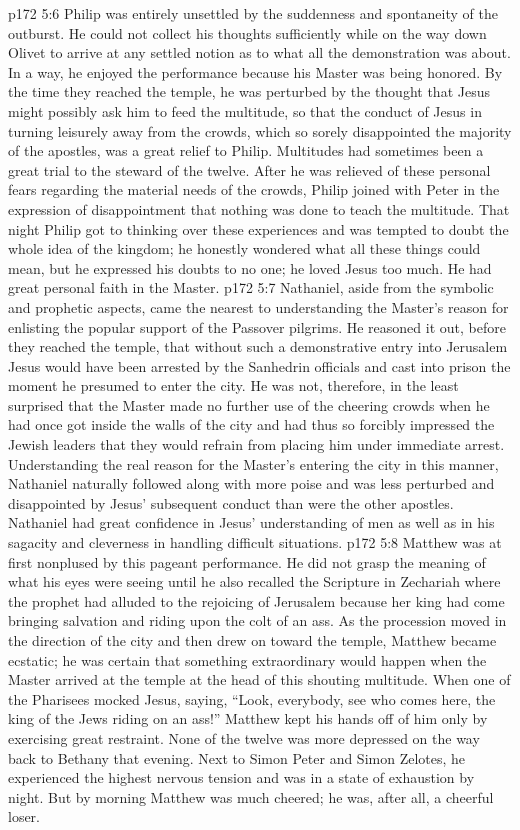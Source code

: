 \pc \vs p172 5:6 Philip was entirely unsettled by the suddenness and spontaneity of the outburst. He could not collect his thoughts sufficiently while on the way down Olivet to arrive at any settled notion as to what all the demonstration was about. In a way, he enjoyed the performance because his Master was being honored. By the time they reached the temple, he was perturbed by the thought that Jesus might possibly ask him to feed the multitude, so that the conduct of Jesus in turning leisurely away from the crowds, which so sorely disappointed the majority of the apostles, was a great relief to Philip. Multitudes had sometimes been a great trial to the steward of the twelve. After he was relieved of these personal fears regarding the material needs of the crowds, Philip joined with Peter in the expression of disappointment that nothing was done to teach the multitude. That night Philip got to thinking over these experiences and was tempted to doubt the whole idea of the kingdom; he honestly wondered what all these things could mean, but he expressed his doubts to no one; he loved Jesus too much. He had great personal faith in the Master.
\pc \vs p172 5:7 Nathaniel, aside from the symbolic and prophetic aspects, came the nearest to understanding the Master’s reason for enlisting the popular support of the Passover pilgrims. He reasoned it out, before they reached the temple, that without such a demonstrative entry into Jerusalem Jesus would have been arrested by the Sanhedrin officials and cast into prison the moment he presumed to enter the city. He was not, therefore, in the least surprised that the Master made no further use of the cheering crowds when he had once got inside the walls of the city and had thus so forcibly impressed the Jewish leaders that they would refrain from placing him under immediate arrest. Understanding the real reason for the Master’s entering the city in this manner, Nathaniel naturally followed along with more poise and was less perturbed and disappointed by Jesus’ subsequent conduct than were the other apostles. Nathaniel had great confidence in Jesus’ understanding of men as well as in his sagacity and cleverness in handling difficult situations.
\pc \vs p172 5:8 Matthew was at first nonplused by this pageant performance. He did not grasp the meaning of what his eyes were seeing until he also recalled the Scripture in Zechariah where the prophet had alluded to the rejoicing of Jerusalem because her king had come bringing salvation and riding upon the colt of an ass. As the procession moved in the direction of the city and then drew on toward the temple, Matthew became ecstatic; he was certain that something extraordinary would happen when the Master arrived at the temple at the head of this shouting multitude. When one of the Pharisees mocked Jesus, saying, “Look, everybody, see who comes here, the king of the Jews riding on an ass!” Matthew kept his hands off of him only by exercising great restraint. None of the twelve was more depressed on the way back to Bethany that evening. Next to Simon Peter and Simon Zelotes, he experienced the highest nervous tension and was in a state of exhaustion by night. But by morning Matthew was much cheered; he was, after all, a cheerful loser.
